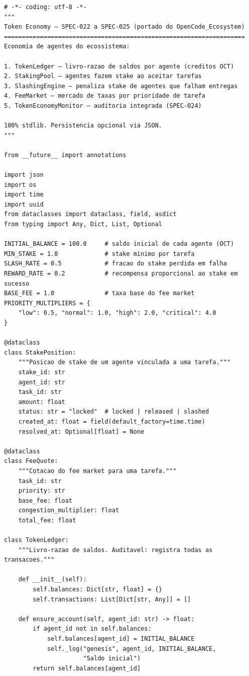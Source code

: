 \begin{verbatim}
# -*- coding: utf-8 -*-
"""
Token Economy — SPEC-022 a SPEC-025 (portado do OpenCode_Ecosystem)
===================================================================
Economia de agentes do ecossistema:

1. TokenLedger — livro-razao de saldos por agente (creditos OCT)
2. StakingPool — agentes fazem stake ao aceitar tarefas
3. SlashingEngine — penaliza stake de agentes que falham entregas
4. FeeMarket — mercado de taxas por prioridade de tarefa
5. TokenEconomyMonitor — auditoria integrada (SPEC-024)

100% stdlib. Persistencia opcional via JSON.
"""

from __future__ import annotations

import json
import os
import time
import uuid
from dataclasses import dataclass, field, asdict
from typing import Any, Dict, List, Optional

INITIAL_BALANCE = 100.0     # saldo inicial de cada agente (OCT)
MIN_STAKE = 1.0             # stake minimo por tarefa
SLASH_RATE = 0.5            # fracao do stake perdida em falha
REWARD_RATE = 0.2           # recompensa proporcional ao stake em sucesso
BASE_FEE = 1.0              # taxa base do fee market
PRIORITY_MULTIPLIERS = {
    "low": 0.5, "normal": 1.0, "high": 2.0, "critical": 4.0
}

@dataclass
class StakePosition:
    """Posicao de stake de um agente vinculada a uma tarefa."""
    stake_id: str
    agent_id: str
    task_id: str
    amount: float
    status: str = "locked"  # locked | released | slashed
    created_at: float = field(default_factory=time.time)
    resolved_at: Optional[float] = None

@dataclass
class FeeQuote:
    """Cotacao do fee market para uma tarefa."""
    task_id: str
    priority: str
    base_fee: float
    congestion_multiplier: float
    total_fee: float

class TokenLedger:
    """Livro-razao de saldos. Auditavel: registra todas as transacoes."""

    def __init__(self):
        self.balances: Dict[str, float] = {}
        self.transactions: List[Dict[str, Any]] = []

    def ensure_account(self, agent_id: str) -> float:
        if agent_id not in self.balances:
            self.balances[agent_id] = INITIAL_BALANCE
            self._log("genesis", agent_id, INITIAL_BALANCE,
                      "Saldo inicial")
        return self.balances[agent_id]


\end{verbatim}
